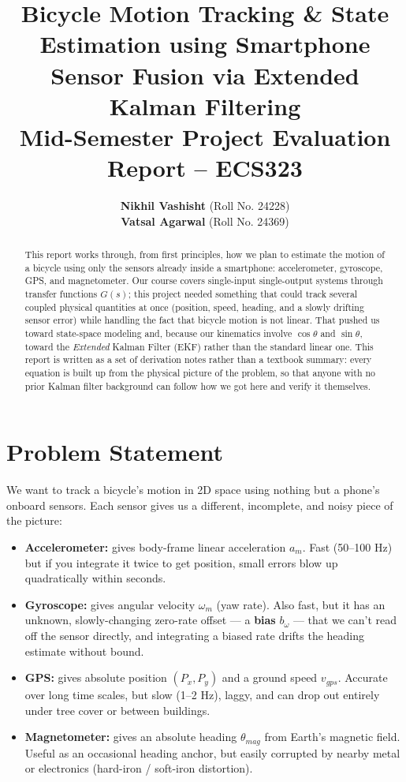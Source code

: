\documentclass[11pt,a4paper]{article}
\title{\LARGE \textbf{Bicycle Motion Tracking \& State Estimation using Smartphone Sensor Fusion via Extended Kalman Filtering}\\[0.5em]
\large Mid-Semester Project Evaluation Report -- ECS323}
\author{
    \textbf{Nikhil Vashisht} (Roll No. 24228) \\
    \textbf{Vatsal Agarwal} (Roll No.  24369) 
}
\begin{document}
\maketitle

\begin{abstract}
This report works through, from first principles, how we plan to estimate the motion of a bicycle using only the sensors already inside a smartphone: accelerometer, gyroscope, GPS, and magnetometer. Our course covers single-input single-output systems through transfer functions $G(s)$; this project needed something that could track several coupled physical quantities at once (position, speed, heading, and a slowly drifting sensor error) while handling the fact that bicycle motion is not linear. That pushed us toward state-space modeling and, because our kinematics involve $\cos\theta$ and $\sin\theta$, toward the \emph{Extended} Kalman Filter (EKF) rather than the standard linear one. This report is written as a set of derivation notes rather than a textbook summary: every equation is built up from the physical picture of the problem, so that anyone with no prior Kalman filter background can follow how we got here and verify it themselves. 
\end{abstract}

\section{Problem Statement}

We want to track a bicycle's motion in 2D space using nothing but a phone's onboard sensors. Each sensor gives us a different, incomplete, and noisy piece of the picture:

\begin{itemize}
    \item \textbf{Accelerometer:} gives body-frame linear acceleration $a_m$. Fast (50--100 Hz) but if you integrate it twice to get position, small errors blow up quadratically within seconds.
    \item \textbf{Gyroscope:} gives angular velocity $\omega_m$ (yaw rate). Also fast, but it has an unknown, slowly-changing zero-rate offset --- a \textbf{bias} $b_\omega$ --- that we can't read off the sensor directly, and integrating a biased rate drifts the heading estimate without bound.
    \item \textbf{GPS:} gives absolute position $(P_x, P_y)$ and a ground speed $v_{gps}$. Accurate over long time scales, but slow (1--2 Hz), laggy, and can drop out entirely under tree cover or between buildings.
    \item \textbf{Magnetometer:} gives an absolute heading $\theta_{mag}$ from Earth's magnetic field. Useful as an occasional heading anchor, but easily corrupted by nearby metal or electronics (hard-iron / soft-iron distortion).
\end{itemize}
\end{document}
